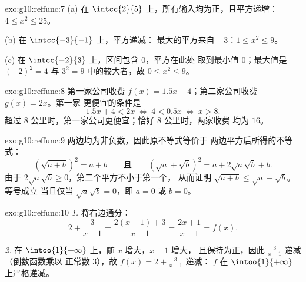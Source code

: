 \begin{solution}{exo:g10:reffunc:7}
(a) 在 $\intcc{2}{5}$ 上，所有输入均为正，且平方递增：
$4 \leq x^2 \leq 25$。

(b) 在 $\intcc{-3}{-1}$ 上，平方递减：
最大的平方来自 $-3$：$1 \leq x^2 \leq 9$。

(c) 在 $\intcc{-2}{3}$ 上，区间包含 $0$，平方在此处
取到最小值 $0$；最大值是 $(-2)^2 = 4$ 与
$3^2 = 9$ 中的较大者，故 $0 \leq x^2 \leq 9$。
\end{solution}

\begin{solution}{exo:g10:reffunc:8}
第一家公司收费 $f(x) = 1.5x + 4$；第二家公司收费 $g(x) = 2x$。第一家
更便宜的条件是
\[
1.5x + 4 < 2x
\ \Longleftrightarrow\
4 < 0.5x
\ \Longleftrightarrow\
x > 8 .
\]
超过 $8$ 公里时，第一家公司更便宜；恰好 $8$ 公里时，两家收费
均为 $16$。
\end{solution}

\begin{solution}{exo:g10:reffunc:9}
两边均为非负数，因此原不等式等价于
两边平方后所得的不等式：
\[
\left(\sqrt{a+b}\right)^2 = a + b
\qquad\text{且}\qquad
\left(\sqrt a + \sqrt b\right)^2 = a + 2\sqrt a \sqrt b + b .
\]
由于 $2\sqrt a\sqrt b \geq 0$，第二个平方不小于第一个，
从而证明 $\sqrt{a+b} \leq \sqrt a + \sqrt b$。等号成立
当且仅当 $\sqrt a \sqrt b = 0$，即 $a = 0$ 或 $b = 0$。
\end{solution}

\begin{solution}{exo:g10:reffunc:10}
\emph{1.} 将右边通分：
\[
2 + \frac{3}{x-1} = \frac{2(x-1) + 3}{x - 1} = \frac{2x + 1}{x - 1}
= f(x).
\]

\emph{2.} 在 $\intoo{1}{+\infty}$ 上，随 $x$ 增大，$x - 1$ 增大，
且保持为正，因此 $\frac{3}{x-1}$ 递减（倒数函数乘以
正常数 $3$），故 $f(x) = 2 + \frac{3}{x-1}$ 递减：
$f$ 在 $\intoo{1}{+\infty}$ 上严格递减。
\end{solution}

